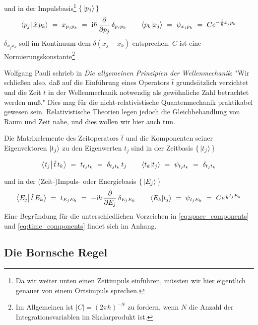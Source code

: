 \documentclass[12pt]{article}
\begin{document}
und in der Impulsbasis\footnote{Da wir weiter unten einen Zeitimpuls einführen, müssten wir hier eigentlich genauer von einem Ortsimpuls sprechen.} $\{\,\ket{p_j}\,\}$
\begin{equation}
\label{eq:space_components}
\bra{p_j}\ket{\,\hat{x}\,p_k}\ =\ x_{p_j p_k}\ =\ 
\mathrm{i}\hbar\,\frac{\partial}{\partial p_j}\,\delta_{p_j p_k}
\quad\quad 
\bra{p_k}\ket{x_j}\ =\ \psi_{x_j p_k}\ =\ C e^{-\frac{i}{\hbar}x_j p_k}
\end{equation}
$\delta_{x_j x_k}$ soll im Kontinuum dem $\delta(x_j - x_k)$ entsprechen. $C$ ist eine Normierungskonstante\footnote{Im Allgemeinen ist $|C|=(2\pi\hbar)^{-N}$ zu fordern, wenn $N$ die Anzahl der Integrationsvariablen im Skalarprodukt ist.}

Wolfgang Pauli schrieb in \emph{Die allgemeinen Prinzipien der Wellenmechanik}: "Wir schließen also, daß auf die Einführung eines Operators $\hat{t}$ grundsätzlich verzichtet und die Zeit $t$ in der Wellenmechanik notwendig als gewöhnliche Zahl betrachtet werden muß." Dies mag für die nicht-relativistische Quantenmechanik praktikabel gewesen sein. Relativistische Theorien legen jedoch die Gleichbehandlung von Raum und Zeit nahe, und dies wollen wir hier auch tun.

Die Matrixelemente des Zeitoperators $\hat{t}$ und die Komponenten seiner Eigenvektoren $\ket{t_j}$ zu den Eigenwerten $t_j$ sind in der Zeitbasis $\{\,\ket{t_j}\,\}$

\begin{equation}
\bra{t_j}\ket{\,\hat{t}\,t_k}\ =\ t_{t_j t_k}\ =\ \delta_{t_j t_k}\,t_j
\quad\quad 
\bra{t_k}\ket{t_j}\ =\ \psi_{t_j t_k}\ =\ \delta_{t_j t_k}
\end{equation}

und in der (Zeit-)Impuls- oder Energiebasis $\{\,\ket{E_j}\,\}$
\begin{equation}
\label{eq:time_components}
\bra{E_j}\ket{\,\hat{t}\,E_k}\ =\ t_{E_j E_k}\ =\ 
-\mathrm{i}\hbar\,\frac{\partial}{\partial E_j}\,\delta_{E_j E_k}
\quad\quad 
\bra{E_k}\ket{t_j}\ =\ \psi_{t_j E_k}\ =\ C e^{\frac{i}{\hbar}t_j E_k}
\end{equation}
Eine Begründung für die unterschiedlichen Vorzeichen in \eqref{eq:space_components} und \eqref{eq:time_components} findet sich im Anhang.

\subsection{Die Bornsche Regel}
\end{document}
